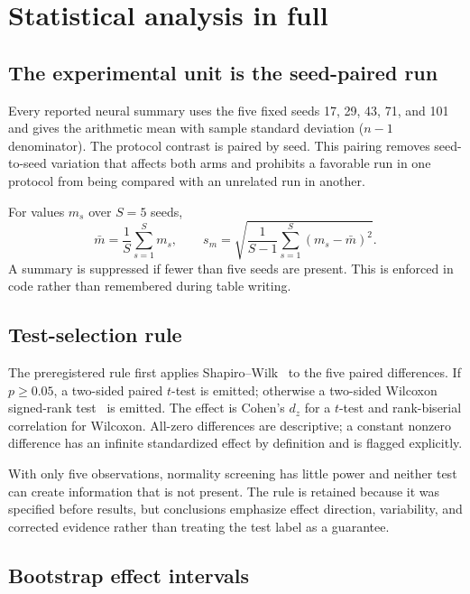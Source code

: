 \documentclass[11pt,oneside]{report}
\begin{document}
\chapter{Statistical analysis in full}

\section{The experimental unit is the seed-paired run}

Every reported neural summary uses the five fixed seeds 17, 29, 43, 71, and 101 and gives the arithmetic mean with sample standard deviation ($n-1$ denominator). The protocol contrast is paired by seed. This pairing removes seed-to-seed variation that affects both arms and prohibits a favorable run in one protocol from being compared with an unrelated run in another.

For values $m_s$ over $S=5$ seeds,
\begin{equation}
\bar m=\frac{1}{S}\sum_{s=1}^{S}m_s,\qquad
s_m=\sqrt{\frac{1}{S-1}\sum_{s=1}^{S}(m_s-\bar m)^2}.
\end{equation}
A summary is suppressed if fewer than five seeds are present. This is enforced in code rather than remembered during table writing.

\section{Test-selection rule}

The preregistered rule first applies Shapiro--Wilk~\cite{shapiro1965normality} to the five paired differences. If $p\geq0.05$, a two-sided paired $t$-test is emitted; otherwise a two-sided Wilcoxon signed-rank test~\cite{wilcoxon1945rank} is emitted. The effect is Cohen's $d_z$ for a $t$-test and rank-biserial correlation for Wilcoxon. All-zero differences are descriptive; a constant nonzero difference has an infinite standardized effect by definition and is flagged explicitly.

With only five observations, normality screening has little power and neither test can create information that is not present. The rule is retained because it was specified before results, but conclusions emphasize effect direction, variability, and corrected evidence rather than treating the test label as a guarantee.

\section{Bootstrap effect intervals}
\end{document}
